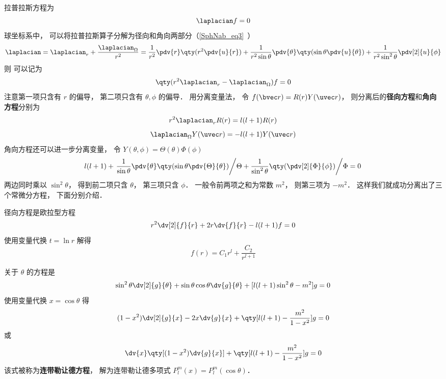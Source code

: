 

拉普拉斯方程为
\begin{equation}
\laplacian f = 0
\end{equation}
球坐标系中， 可以将拉普拉斯算子分解为径向和角向两部分（\autoref{SphNab_eq3}~）
\begin{equation}
\laplacian = \laplacian_r + \frac{\laplacian_{\Omega}}{r^2} = \frac{1}{r^2} \pdv{r} \qty(r^2 \pdv{u}{r}) + \frac{1}{r^2\sin\theta}\pdv{\theta} \qty(\sin \theta \pdv{u}{\theta}) + \frac{1}{r^2\sin^2 \theta} \pdv[2]{u}{\phi}
\end{equation}
则 可以记为
\begin{equation}
\qty(r^2\laplacian_r - \laplacian_\Omega) f = 0
\end{equation}
注意第一项只含有 $r$ 的偏导， 第二项只含有 $\theta,\phi$ 的偏导． 用分离变量法， 令 $f(\bvec r) = R(r) Y(\uvec r)$， 则分离后的\textbf{径向方程}和\textbf{角向方程}分别为
\begin{equation}
r^2\laplacian_r R(r) = l(l+1)R(r)
\end{equation}
\begin{equation}
\laplacian_{\Omega} Y(\uvec r) = -l(l+1) Y(\uvec r)
\end{equation}
角向方程还可以进一步分离变量， 令 $Y(\theta,\phi) = \Theta(\theta)\Phi(\phi)$
\begin{equation}\label{SphLap_eq3}
l(l+1) + \left. \frac{1}{\sin\theta}\pdv{\theta} \qty(\sin \theta \pdv{\Theta}{\theta}) \middle/ \Theta + \frac{1}{\sin^2 \theta} \qty(\pdv[2]{\Phi}{\phi}) \middle/ \Phi = 0 \right.
\end{equation}
两边同时乘以 $\sin^2\theta$， 得到前二项只含 $\theta$， 第三项只含 $\phi$． 一般令前两项之和为常数 $m^2$， 则第三项为 $-m^2$． 这样我们就成功分离出了三个常微分方程， 下面分别介绍．

径向方程是欧拉型方程%
\begin{equation}
r^2\dv[2]{f}{r} + 2r\dv{f}{r} - l(l+1)f = 0
\end{equation}
使用变量代换 $t = \ln r$ 解得
\begin{equation}
f(r) = C_1 r^l + \frac{C_2}{r^{l+1}}
\end{equation}

关于 $\theta$ 的方程是
\begin{equation}
\sin^2\theta \dv[2]{g}{\theta} + \sin\theta\cos\theta\dv{g}{\theta} + [l(l+1)\sin^2\theta - m^2] g = 0
\end{equation}
使用变量代换 $x = \cos\theta$ 得
\begin{equation}
(1-x^2)\dv[2]{g}{x} - 2x\dv{g}{x} + \qty[l(l+1) - \frac{m^2}{1-x^2}]g = 0
\end{equation}
或
\begin{equation}
\dv{x} \qty[(1-x^2)\dv{g}{x}] + \qty[l(l+1) - \frac{m^2}{1-x^2}]g = 0
\end{equation}
该式被称为\textbf{连带勒让德方程}， 解为连带勒让德多项式 $P_l^m(x) = P_l^m(\cos\theta)$．

